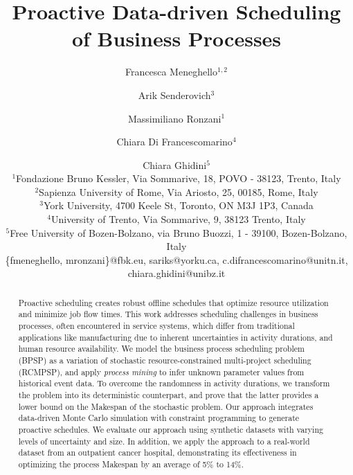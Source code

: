\documentclass{article}
\title{Proactive Data-driven Scheduling of Business Processes}
\author{
Francesca Meneghello$^{1,2}$
\and
Arik Senderovich$^3$ \and
Massimiliano Ronzani$^{1}$ \and
Chiara Di Francescomarino$^4$ \and
Chiara Ghidini$^5$\\
\affiliations
$^1$Fondazione Bruno Kessler, Via Sommarive, 18, POVO - 38123, Trento, Italy\\
$^2$Sapienza University of Rome, Via Ariosto, 25, 00185, Rome, Italy \\
$^3$York University, 4700 Keele St, Toronto,  ON M3J 1P3, Canada\\
$^4$University of Trento, Via Sommarive, 9, 38123 Trento, Italy\\
$^5$Free University of Bozen-Bolzano, via Bruno Buozzi, 1 - 39100, Bozen-Bolzano, Italy\\
\emails
\{fmeneghello, mronzani\}@fbk.eu,
sariks@yorku.ca,
c.difrancescomarino@unitn.it, chiara.ghidini@unibz.it
}
\begin{document}
\maketitle

\begin{abstract}
    Proactive scheduling creates 
robust offline schedules 
that optimize resource utilization and minimize job flow times. 
This work addresses scheduling challenges in business processes, often
encountered in service systems, 
which differ from traditional applications like manufacturing due to inherent uncertainties in activity durations, and human resource availability.
We model the business process scheduling 
problem (BPSP) as a variation of stochastic
resource-constrained multi-project scheduling (RCMPSP), and 
apply \emph{process mining} to infer unknown
parameter values from historical event data. To overcome 
the randomness in activity durations, we transform 
the problem into its deterministic counterpart, and 
prove that the latter provides a lower bound on the
Makespan of the stochastic problem. Our approach integrates data-driven Monte Carlo simulation with constraint programming to generate proactive schedules.
We evaluate our approach using synthetic datasets with varying levels of uncertainty and size.
In addition, we apply the approach to a real-world dataset from an outpatient cancer hospital, demonstrating its effectiveness in optimizing the process Makespan by an average of 5\% to 14\%.
\end{abstract}


















%
\end{document}
